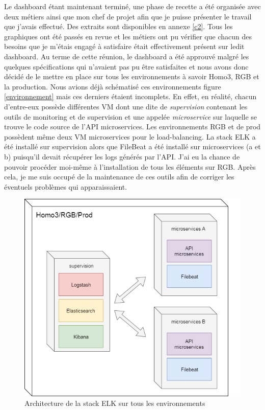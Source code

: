 	Le dashboard étant maintenant terminé, une phase de recette a été organisée avec deux métiers ainsi que mon chef de projet afin que je puisse présenter le travail que j'avais effectué. Des extraits sont disponibles en annexe \ref{c2}. Tous les graphiques ont été passés en revue et les métiers ont pu vérifier que chacun des besoins que je m'étais engagé à satisfaire était effectivement présent sur ledit dashboard. Au terme de cette réunion, le dashboard a été approuvé malgré les quelques spécifications qui n'avaient pas pu être satisfaites et nous avons donc décidé de le mettre en place sur tous les environnements à savoir Homo3, RGB et la production. Nous avions déjà schématisé ces environnements figure \ref{environnement} mais ces derniers étaient incomplets. En effet, en réalité, chacun d'entre-eux possède différentes VM dont une dite de \textit{supervision} contenant les outils de monitoring et de supervision et une appelée \textit{microservice} sur laquelle se trouve le code source de l'API microservices. Les environnements RGB et de prod possèdent même deux VM microservices pour le load-balancing. La stack ELK a été installé sur supervision alors que FileBeat a été installé sur microservices (a et b) puisqu'il devait récupérer les logs générés par l'API. J'ai eu la chance de pouvoir procéder moi-même à l'installation de tous les éléments sur RGB. Après cela, je me suis occupé de la maintenance de ces outils afin de corriger les éventuels problèmes qui apparaissaient.\\
	
\begin{figure}[h!]
	\includegraphics[scale=0.45]{images/travailNeuflizeOBC/dashboard/elkDeploiement.png}
	\centering
	\caption{Architecture de la stack ELK sur tous les environnements}
	\label{elkDeploiement}
\end{figure}

